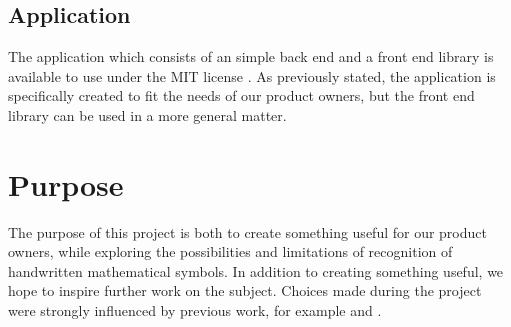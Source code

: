 \subsection{Application}
The application which consists of an simple back end and a front end library is available to use under the MIT license \parencite{_mit_????}. As previously stated, the application is specifically created to fit the needs of our product owners, but the front end library can be used in a more general matter. %



\section{Purpose}

The purpose of this project is both to create something useful for our product owners, while exploring the possibilities and limitations of recognition of handwritten mathematical symbols. In addition to creating something useful, we hope to inspire further work on the subject. Choices made during the project were strongly influenced by previous work, for example \cite{thoma_-line_2015} and \cite{lu_recognition_????}.
